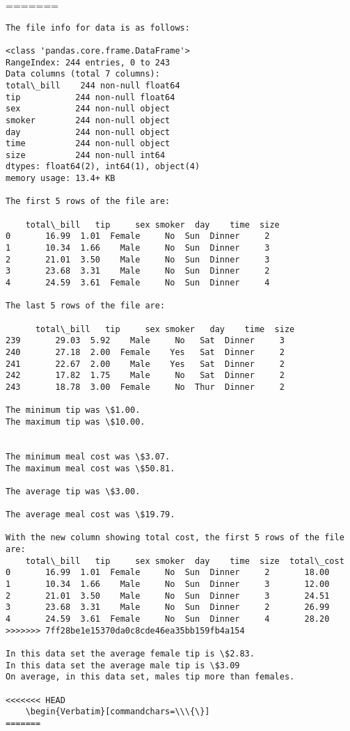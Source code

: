 \documentclass[11pt]{article}
\begin{document}
=======
    \begin{Verbatim}[commandchars=\\\{\}]
The file info for data is as follows: 

<class 'pandas.core.frame.DataFrame'>
RangeIndex: 244 entries, 0 to 243
Data columns (total 7 columns):
total\_bill    244 non-null float64
tip           244 non-null float64
sex           244 non-null object
smoker        244 non-null object
day           244 non-null object
time          244 non-null object
size          244 non-null int64
dtypes: float64(2), int64(1), object(4)
memory usage: 13.4+ KB

The first 5 rows of the file are: 

    total\_bill   tip     sex smoker  day    time  size
0       16.99  1.01  Female     No  Sun  Dinner     2
1       10.34  1.66    Male     No  Sun  Dinner     3
2       21.01  3.50    Male     No  Sun  Dinner     3
3       23.68  3.31    Male     No  Sun  Dinner     2
4       24.59  3.61  Female     No  Sun  Dinner     4

The last 5 rows of the file are: 

      total\_bill   tip     sex smoker   day    time  size
239       29.03  5.92    Male     No   Sat  Dinner     3
240       27.18  2.00  Female    Yes   Sat  Dinner     2
241       22.67  2.00    Male    Yes   Sat  Dinner     2
242       17.82  1.75    Male     No   Sat  Dinner     2
243       18.78  3.00  Female     No  Thur  Dinner     2

The minimum tip was \$1.00.
The maximum tip was \$10.00.


The minimum meal cost was \$3.07.
The maximum meal cost was \$50.81.

The average tip was \$3.00.

The average meal cost was \$19.79.

With the new column showing total cost, the first 5 rows of the file are: 
    total\_bill   tip     sex smoker  day    time  size  total\_cost
0       16.99  1.01  Female     No  Sun  Dinner     2       18.00
1       10.34  1.66    Male     No  Sun  Dinner     3       12.00
2       21.01  3.50    Male     No  Sun  Dinner     3       24.51
3       23.68  3.31    Male     No  Sun  Dinner     2       26.99
4       24.59  3.61  Female     No  Sun  Dinner     4       28.20
>>>>>>> 7ff28be1e15370da0c8cde46ea35bb159fb4a154

In this data set the average female tip is \$2.83.
In this data set the average male tip is \$3.09
On average, in this data set, males tip more than females.

<<<<<<< HEAD
    \begin{Verbatim}[commandchars=\\\{\}]
=======
    \end{Verbatim}
\end{document}

